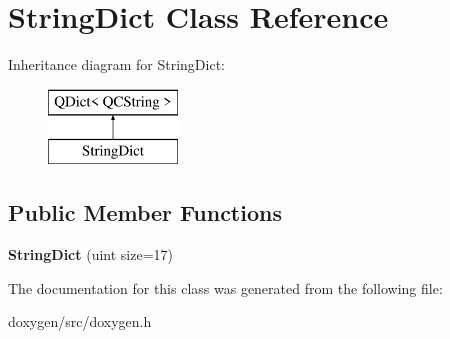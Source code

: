 \hypertarget{class_string_dict}{}\section{String\+Dict Class Reference}
\label{class_string_dict}
Inheritance diagram for String\+Dict\+:\begin{figure}[H]
\begin{center}
\leavevmode
\includegraphics[height=2.000000cm]{class_string_dict}
\end{center}
\end{figure}
\subsection*{Public Member Functions}
\begin{DoxyCompactItemize}
\item 
\mbox{\label{class_string_dict_a72d0f6d28560dd1853810e8f88bf4900}} 
{\bfseries String\+Dict} (uint size=17)
\end{DoxyCompactItemize}


The documentation for this class was generated from the following file\+:\begin{DoxyCompactItemize}
\item 
doxygen/src/doxygen.\+h\end{DoxyCompactItemize}
